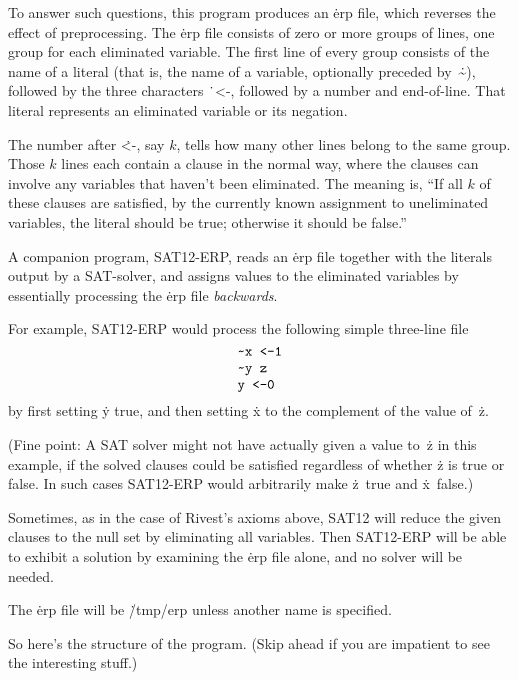 To answer such questions, this program produces an \.{erp}
file, which reverses the effect of preprocessing. The \.{erp} file
consists of zero or more groups of lines, one group for each
eliminated variable. The first line of every group consists of
the name of a literal (that is, the name of a variable, optionally preceded
by~\.{\~}), followed by the three characters \.{\ <-}, followed by a
number and end-of-line. That literal represents an eliminated variable
or its negation.

The number after \.{<-}, say $k$, tells how many other lines belong to the
same group. Those $k$ lines each contain a clause in the normal way,
where the clauses can involve any variables that haven't been eliminated.
The meaning is, ``If all $k$ of these clauses are satisfied, by the
currently known assignment to uneliminated variables, the
literal should be true; otherwise it should be false.''

A companion program, {\mc SAT12-ERP}, reads an \.{erp} file together
with the literals output by a {\mc SAT}-solver, and assigns values to
the eliminated variables by essentially processing the \.{erp} file
{\it backwards}.

For example, {\mc SAT12-ERP} would process the following simple
three-line file
$$\chardef~=`\~
\vcenter{\halign{\tt#\hfil\cr
~x <-1\cr
~y z\cr
y <-0\cr
}}$$
by first setting \.y true, and then setting \.x to the complement
of the value of~\.z.

(Fine point: A {\mc SAT} solver might not have actually given a value
to~\.z in this example, if the solved clauses could be satisfied
regardless of whether \.z is true or false. In such cases
{\mc SAT12-ERP} would arbitrarily make \.z~true and \.x~false.)

Sometimes, as in the case of Rivest's axioms above, {\mc SAT12} will
reduce the given clauses to the null set by eliminating all variables.
Then {\mc SAT12-ERP} will be able to exhibit a solution by examining
the \.{erp} file alone, and no solver will be needed.

The \.{erp} file will be \.{/tmp/erp} unless another name is specified.

\fi

So here's the structure of the program. (Skip ahead if you
are
impatient to see the interesting stuff.)

